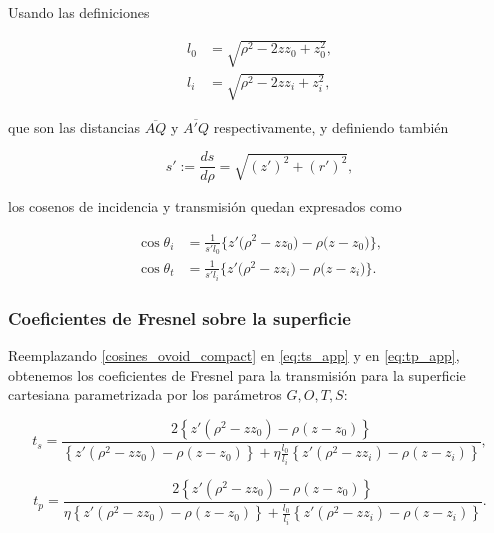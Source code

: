 Usando las definiciones

\begin{align}
l_0
&=
\sqrt{\rho^2 - 2zz_0 + z_0^2},
\\
l_i
&=
\sqrt{\rho^2 - 2zz_i + z_i^2},
\label{eq:l0_li_definitions}
\end{align}

que son las distancias $\overline{AQ}$ y $\overline{A'Q}$ respectivamente, y definiendo también

\begin{equation}
  s'
  :=
  \frac{ds}{d\rho}
  =
  \sqrt{(z')^2 + (r')^2},
  \label{eq:ds_drho}
\end{equation}

los cosenos de incidencia y transmisión quedan expresados como

\begin{equation}
\begin{aligned}
  \cos\theta_i
  &=
  \frac{1}{s'l_0}
  \big\{
  z'\big(\rho^2 - z z_0\big)
  -
  \rho\big(z - z_0\big)
  \big\},
\\
  \cos\theta_t
  &=
  \frac{1}{s'l_i}
  \big\{
  z'\big(\rho^2 - z z_i\big)
  -
  \rho\big(z - z_i\big)
  \big\}.
\end{aligned}
\label{cosines_ovoid}
\end{equation}

\subsubsection{Coeficientes de Fresnel sobre la superficie}

Reemplazando \eqref{cosines_ovoid_compact} en \eqref{eq:ts_app} y en \eqref{eq:tp_app}, obtenemos los coeficientes de Fresnel para la transmisión para la superficie cartesiana parametrizada por los parámetros $G,O,T,S$:

\begin{equation}
 t_s
 =
 \frac{
 2 \left\{ z'(\rho^2 - zz_0) - \rho(z - z_0) \right\}
 }
 {
 \left\{ z'(\rho^2 - zz_0) - \rho(z - z_0) \right\}
 +
 \eta \frac{l_0}{l_i}
 \left\{ z'(\rho^2 - zz_i) - \rho(z - z_i) \right\}
 },
  \label{eq:t_s_ovoid}
\end{equation}

\begin{equation}
 t_p
 =
 \frac{
 2 \left\{ z'(\rho^2 - zz_0) - \rho(z - z_0) \right\}
 }
 {
 \eta
 \left\{ z'(\rho^2 - zz_0) - \rho(z - z_0) \right\}
 +
 \frac{l_0}{l_i}
 \left\{ z'(\rho^2 - zz_i) - \rho(z - z_i) \right\}
 }.
  \label{eq:t_p_ovoid}
\end{equation}

